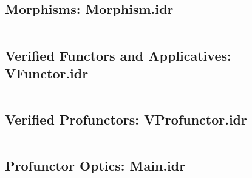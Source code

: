\documentclass[]{report}
\begin{document}
\inputminted[breaklines,linenos]{idris}{../src/Primitive/PrimitiveOptics.idr}

\subsection{Morphisms: Morphism.idr}

\inputminted[breaklines,linenos]{idris}{../src/Category/Morphism.idr}

\subsection{Verified Functors and Applicatives: VFunctor.idr}

\inputminted[breaklines,linenos]{idris}{../src/Category/VFunctor.idr}

\subsection{Verified Profunctors: VProfunctor.idr}

\inputminted[breaklines,linenos]{idris}{../src/Category/VProfunctor.idr}

\subsection{Profunctor Optics: Main.idr}

\inputminted[breaklines,linenos]{idris}{../src/Main.idr}
\end{document}
